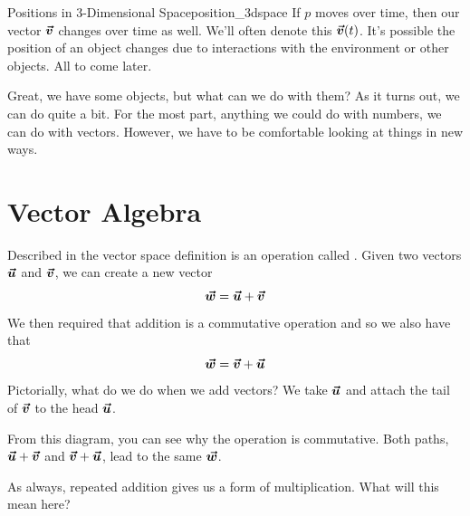 \begin{ex}{Positions in 3-Dimensional Space}{position_3dspace}
        If $p$ moves over time, then our vector $\boldsymbol{\boldsymbol{\vec{v}}}$ changes over time as well. We'll often denote this $\boldsymbol{\boldsymbol{\vec{v}}}(t)$.  It's possible the position of an object changes due to interactions with the environment or other objects.  All to come later.
        \end{ex}
        
        Great, we have some objects, but what can we do with them?  As it turns out, we can do quite a bit.  For the most part, anything we could do with numbers, we can do with vectors.  However, we have to be comfortable looking at things in new ways.
        
        \section{Vector Algebra}
        
        Described in the vector space definition is an operation called .  Given two vectors $\boldsymbol{\boldsymbol{\vec{u}}}$ and $\boldsymbol{\boldsymbol{\vec{v}}}$, we can create a new vector
        \[
        \boldsymbol{\boldsymbol{\vec{w}}} = \boldsymbol{\boldsymbol{\vec{u}}} + \boldsymbol{\boldsymbol{\vec{v}}}
        \]
        We then required that addition is a commutative operation and so we also have that
        \[
        \boldsymbol{\boldsymbol{\vec{w}}} = \boldsymbol{\boldsymbol{\vec{v}}}+\boldsymbol{\boldsymbol{\vec{u}}}
        \]
        Pictorially, what do we do when we add vectors? We take $\boldsymbol{\boldsymbol{\vec{u}}}$ and attach the tail of $\boldsymbol{\boldsymbol{\vec{v}}}$ to the head $\boldsymbol{\boldsymbol{\vec{u}}}$. 
        
        \begin{center}
        \end{center}
        
        From this diagram, you can see why the operation is commutative.  Both paths, $\boldsymbol{\boldsymbol{\vec{u}}}+\boldsymbol{\boldsymbol{\vec{v}}}$ and $\boldsymbol{\boldsymbol{\vec{v}}}+\boldsymbol{\boldsymbol{\vec{u}}}$, lead to the same $\boldsymbol{\boldsymbol{\vec{w}}}$.
        
        As always, repeated addition gives us a form of multiplication. What will this mean here? 
        
